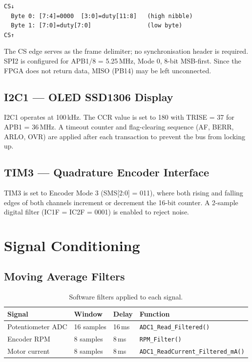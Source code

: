 \documentclass[12pt, a4paper]{report}
\begin{document}
\begin{verbatim}
CS↓
  Byte 0: [7:4]=0000  [3:0]=duty[11:8]   (high nibble)
  Byte 1: [7:0]=duty[7:0]                (low byte)
CS↑
\end{verbatim}

The CS edge serves as the frame delimiter; no synchronisation header is
required. SPI2 is configured for APB1/8 = 5.25\,MHz, Mode 0, 8-bit MSB-first.
Since the FPGA does not return data, MISO (PB14) may be left unconnected.

\subsection{I2C1 — OLED SSD1306 Display}

I2C1 operates at 100\,kHz. The CCR value is set to 180 with TRISE = 37 for
APB1 = 36\,MHz. A timeout counter and flag-clearing sequence (AF, BERR,
ARLO, OVR) are applied after each transaction to prevent the bus from
locking up.

\subsection{TIM3 — Quadrature Encoder Interface}

TIM3 is set to Encoder Mode 3 (SMS[2:0] = 011), where both rising and
falling edges of both channels increment or decrement the 16-bit counter.
A 2-sample digital filter (IC1F = IC2F = 0001) is enabled to reject noise.

\section{Signal Conditioning}

\subsection{Moving Average Filters}

\begin{table}[H]
    \centering
    \caption{Software filters applied to each signal.}
    \label{tab:filters}
    \begin{tabular}{llll}
        \toprule
        \textbf{Signal} & \textbf{Window} & \textbf{Delay} & \textbf{Function} \\
        \midrule
        Potentiometer ADC & 16 samples & 16\,ms & \texttt{ADC1\_Read\_Filtered()} \\
        Encoder RPM       & 8 samples  & 8\,ms  & \texttt{RPM\_Filter()} \\
        Motor current     & 8 samples  & 8\,ms  & \texttt{ADC1\_ReadCurrent\_Filtered\_mA()} \\
        \bottomrule
    \end{tabular}
\end{table}
\end{document}

